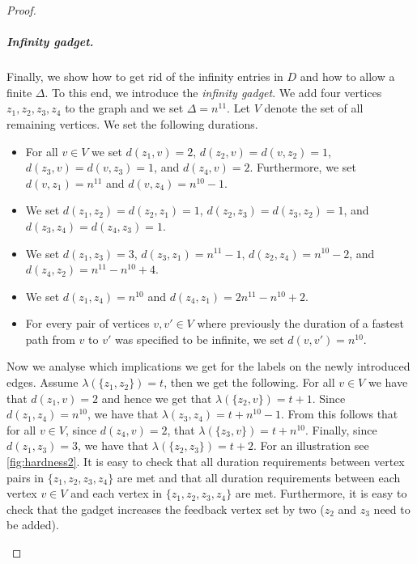 \documentclass[a4paper,UKenglish,cleveref, autoref, thm-restate, anonymous]{lipics-v2021}
\begin{document}
\begin{proof}
\subparagraph{Infinity gadget.} Finally, we show how to get rid of the infinity entries in $D$ and how to allow a finite $\Delta$. To this end, we introduce the \emph{infinity gadget}. We add four vertices $z_1, z_2, z_3, z_4$ to the graph and we set $\Delta=n^{11}$. Let $V$ denote the set of all remaining vertices. We set the following durations.
\begin{itemize}
    \item For all $v\in V$ we set $d(z_1,v)=2$, $d(z_2,v)=d(v,z_2)=1$, $d(z_3,v)=d(v,z_3)=1$, and $d(z_4,v)=2$.
    Furthermore, we set $d(v,z_1)=n^{11}$ and $d(v,z_4)=n^{10}-1$.
    \item We set $d(z_1,z_2)=d(z_2,z_1)=1$, $d(z_2,z_3)=d(z_3,z_2)=1$, and $d(z_3,z_4)=d(z_4,z_3)=1$.
    \item We set $d(z_1,z_3)=3$, $d(z_3,z_1)=n^{11}-1$, $d(z_2,z_4)=n^{10}-2$, and $d(z_4,z_2)=n^{11}-n^{10}+4$.
    \item We set $d(z_1,z_4)=n^{10}$ and $d(z_4,z_1)=2n^{11}-n^{10}+2$.
    \item For every pair of vertices $v,v'\in V$ where previously the duration of a fastest path from $v$ to $v'$ was specified to be infinite, we set $d(v,v')=n^{10}$.
\end{itemize}
Now we analyse which implications we get for the labels on the newly introduced edges.
Assume $\lambda(\{z_1,z_2\})=t$, then we get the following.
    For all $v\in V$ we have that $d(z_1,v)=2$ and hence we get that $\lambda(\{z_2,v\})=t+1$. 
    Since $d(z_1,z_4)=n^{10}$, we have that $\lambda(z_3,z_4)=t+n^{10}-1$.
    From this follows that for all $v\in V$, since $d(z_4,v)=2$, that $\lambda(\{z_3,v\})=t+n^{10}$.
    Finally, since $d(z_1,z_3)=3$, we have that $\lambda(\{z_2,z_3\})=t+2$.
For an illustration see \cref{fig:hardness2}. It is easy to check that all duration requirements between vertex pairs in $\{z_1,z_2,z_3,z_4\}$ are met and that all duration requirements between each vertex $v\in V$ and each vertex in  $\{z_1,z_2,z_3,z_4\}$ are met. Furthermore, it is easy to check that the gadget increases the feedback vertex set by two ($z_2$ and $z_3$ need to be added).

\begin{figure}[t]
\centering


\end{figure}
\end{proof}
\end{document}
